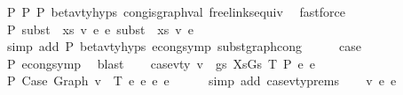 \begin{isabellebody}
\ P{}\ P{}\ P{}\ beta{\isacharunderscore}{\kern0pt}v{\isacharunderscore}{\kern0pt}ty{\isachardot}{\kern0pt}hyps{\isacharparenleft}{\kern0pt}{}{\isacharcomma}{\kern0pt}{}{\isacharcomma}{\kern0pt}{}{\isacharparenright}{\kern0pt}\ cong{\isacharunderscore}{\kern0pt}is{\isacharunderscore}{\kern0pt}graph{\isacharunderscore}{\kern0pt}val\ freelinks{\isacharunderscore}{\kern0pt}equiv\ \isamarkupfalse%
\ fastforce\isanewline
\isanewline
\ \ \isamarkupfalse%
\ P{}{\isacharcolon}{\kern0pt}\ {\isachardoublequoteopen}subst\ {}\ xs\ v{\isacharprime}{\kern0pt}\ e\ {\isasymsimeq}e\ subst\ {}\ xs\ v\ e{\isachardoublequoteclose}\isanewline
\ \ \ \ \isamarkupfalse%
\ {\isacharparenleft}{\kern0pt}simp\ add{\isacharcolon}{\kern0pt}\ P{}\ beta{\isacharunderscore}{\kern0pt}v{\isacharunderscore}{\kern0pt}ty{\isachardot}{\kern0pt}hyps{\isacharparenleft}{\kern0pt}{}{\isacharcomma}{\kern0pt}{}{\isacharparenright}{\kern0pt}\ econg{\isacharunderscore}{\kern0pt}symp\ subst{\isacharunderscore}{\kern0pt}graph{\isacharunderscore}{\kern0pt}cong{}{\isacharparenright}{\kern0pt}\isanewline
\isanewline
\ \ \isamarkupfalse%
\ \isamarkupfalse%
\ {\isacharquery}{\kern0pt}case\isanewline
\ \ \ \ \isamarkupfalse%
\ P{}\ econg{\isacharunderscore}{\kern0pt}symp\ \isamarkupfalse%
\ blast\isanewline
{}\isamarkupfalse%
\isanewline
\ \ \isamarkupfalse%
\ {\isacharparenleft}{\kern0pt}case{}{\isacharunderscore}{\kern0pt}v{\isacharunderscore}{\kern0pt}ty\ v\ {\isasymGamma}\ gs\ XsGs\ T\ P\ e{}\ e{}{\isacharparenright}{\kern0pt}\isanewline
\ \ \isanewline
\ \ \isamarkupfalse%
\ P{}{\isacharcolon}{\kern0pt}\ {\isachardoublequoteopen}Case\ {\isacharparenleft}{\kern0pt}Graph\ v{\isacharparenright}{\kern0pt}\ {\isasymGamma}\ T\ e{}\ e{}\ {\isasymsimeq}e\ e{}{\isacharprime}{\kern0pt}{\isachardoublequoteclose}\isanewline
\ \ \ \ \isamarkupfalse%
\ {\isacharparenleft}{\kern0pt}simp\ add{\isacharcolon}{\kern0pt}\ case{}{\isacharunderscore}{\kern0pt}v{\isacharunderscore}{\kern0pt}ty{\isachardot}{\kern0pt}prems{\isacharparenright}{\kern0pt}\isanewline
\isanewline
\ \ \isamarkupfalse%
\ v{\isacharprime}{\kern0pt}\ e{}{\isacharprime}{\kern0pt}{\isacharprime}{\kern0pt}\ e{}{\isacharprime}{\kern0pt}{\isacharprime}{\kern0pt}\ \isanewline

\end{isabellebody}
